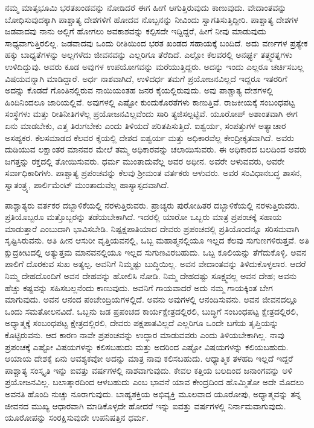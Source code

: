 ನಮ್ಮ ಮಾತೃಭೂಮಿ ಭರತಖಂಡವನ್ನು ನೋಡಿದರೆ ಈಗ ಹೀಗೆ ಆಗುತ್ತಿರುವುದು ಕಾಣುವುದು. ವೇದಾಂತವನ್ನು ಬೋಧಿಸುವುದಕ್ಕಾಗಿ ಪಾಶ್ಚಾತ್ಯ ದೇಶಗಳಿಗೆ ಹೋದವ\- ನೊಬ್ಬನನ್ನು ನೀವಿಂದು ಸ್ವಾಗತಿಸುತ್ತಿದ್ದೀರಿ. ಪಾಶ್ಚಾತ್ಯ ದೇಶಗಳ ಜಡವಾದವು ನಾನು ಅಲ್ಲಿಗೆ ಹೋಗಲು ಅವಕಾಶವನ್ನು ಕಲ್ಪಿಸದೇ ಇದ್ದಿದ್ದರೆ, ಹೀಗೆ ನೀವು ಮಾಡುವುದು ಸಾಧ್ಯವಾಗುತ್ತಿರಲಿಲ್ಲ. ಜಡವಾದವು ಒಂದು ರೀತಿಯಿಂದ ಭರತ ಖಂಡದ ಸಹಾಯಕ್ಕೆ ಬಂದಿದೆ. ಅದು ವರ್ಣಗಳ ಪ್ರತ್ಯೇಕ ಹಕ್ಕು ಬಾಧ್ಯತೆಗಳನ್ನು ಅಲ್ಲಗಳೆದು ಜೀವನವನ್ನು ಎಲ್ಲರಿಗೂ ತೆರೆದಿದೆ. ಎಲ್ಲೋ ಕೆಲವರಲ್ಲಿ ಅನರ್ಘ್ಯ ತತ್ತ್ವರತ್ನಗಳು ಉಳಿದಿದ್ದುವು. ಅವರು ಕೂಡ ಅವುಗಳ ಉಪಯೋಗವನ್ನು ಮರೆಯುತ್ತಿದ್ದರು. ಅದನ್ನು ಇಂದು ಎಲ್ಲರೂ ಚರ್ಚಿಸಬಲ್ಲ ವಿಷಯವನ್ನಾಗಿ ಮಾಡಿದ್ದಾರೆ. ಅರ್ಧ ನಾಶವಾಗಿದೆ, ಉಳಿದರ್ಧ ತಮಗೆ ಪ್ರಯೋಜನವಿಲ್ಲದೆ ಇದ್ದರೂ ಇತರರಿಗೆ ಅದನ್ನು ಕೊಡದೆ ಗೊಂತಿನಲ್ಲಿರುವ ನಾಯಿಯಂತಹ ಜನರ ಕೈಯಲ್ಲಿರುವುದು. ಅವು ಪಾಶ್ಚಾತ್ಯ ದೇಶಗಳಲ್ಲಿ ಹಿಂದಿನಿಂದಲೂ ಜಾರಿಯಲ್ಲಿವೆ. ಅವುಗಳಲ್ಲಿ ಎಷ್ಟೋ ಕುಂದುಕೊರತೆಗಳು ಕಾಣುತ್ತಿವೆ. ರಾಜಕೀಯಕ್ಕೆ ಸಂಬಂಧಪಟ್ಟ ಸಂಸ್ಥೆಗಳು ಮತ್ತು ರೀತಿನೀತಿಗಳೆಲ್ಲ ಪ್ರಯೋಜನವಿಲ್ಲವೆಂದು ಸಾರಿ ತ್ಯಜಿಸಲ್ಪಟ್ಟಿವೆ. ಯೂರೋಪ್​ ಅಶಾಂತವಾಗಿ ಈಗ ಏನು ಮಾಡಬೇಕು, ಎತ್ತ ತಿರುಗಬೇಕು ಎಂದು ತಿಳಿಯದೆ ಪರಿತಪಿಸುತ್ತಿದೆ. ಐಶ್ವರ್ಯ, ಸಂಪತ್ತುಗಳ ಅತ್ಯಾಚಾರ ಅಸಹ್ಯಕರ. ಕೆಲಸಮಾಡದ ಕೆಲವರ ಕೈಯಲ್ಲಿ ದೇಶದ ಐಶ್ವರ್ಯ ಮತ್ತು ಅಧಿಕಾರವೆಲ್ಲ ಕೇಂದ್ರೀಕೃತವಾಗಿದೆ. ಅವರು ದುಡಿಯುವ ಲಕ್ಷಾಂತರ ಮಾನವರ ಮೇಲೆ ತಮ್ಮ ಅಧಿಕಾರವನ್ನು ಚಲಾಯಿಸುವರು. ಈ ಅಧಿಕಾರದ ಬಲದಿಂದ ಅವರು ಜಗತ್ತನ್ನು ರಕ್ತದಲ್ಲಿ ತೋಯಿಸುವರು. ಧರ್ಮ ಮುಂತಾದುವೆಲ್ಲ ಅವರ ಅಧೀನ. ಅವರೇ ಆಳುವವರು, ಅವರೇ ಸರ್ವಾಧಿಕಾರಿಗಳು. ಪಾಶ್ಚಾತ್ಯ ಪ್ರಪಂಚವನ್ನು ಕೆಲವು ಶ‍್ರೀಮಂತ ವರ್ತಕರು ಆಳುವರು. ಅವರ ಸಂವಿಧಾನಬದ್ಧ ಶಾಸನ, ಸ್ವಾತಂತ್ರ್ಯ, ಪಾರ್ಲಿಮೆಂಟ್​ ಮುಂತಾದುವೆಲ್ಲ ಹಾಸ್ಯಾಸ್ಪದವಾಗಿದೆ.

ಪಾಶ್ಚಾತ್ಯರು ವರ್ತಕರ ದಬ್ಬಾಳಿಕೆಯಲ್ಲಿ ನರಳುತ್ತಿರುವರು. ಪ್ರಾಚ್ಯರು ಪುರೋಹಿತರ ದಬ್ಬಾಳಿಕೆಯಲ್ಲಿ ನರಳುತ್ತಿರುವರು. ಪ್ರತಿಯೊಬ್ಬರೂ ಮತ್ತೊಬ್ಬರನ್ನು ತಡೆಯಬೇಕಾಗಿದೆ. ಇದರಲ್ಲಿ ಯಾರೋ ಒಬ್ಬರು ಮಾತ್ರ ಪ್ರಪಂಚಕ್ಕೆ ಸಹಾಯ ಮಾಡುತ್ತಾರೆ ಎಂಬುದಾಗಿ ಭಾವಿಸಬೇಡಿ. ನಿಷ್ಪಕ್ಷಪಾತಿಯಾದ ದೇವರು ಪ್ರಪಂಚದಲ್ಲಿ ಪ್ರತಿಯೊಂದನ್ನೂ ಸರಿಸಮವಾಗಿ ಸೃಷ್ಟಿಸಿರುವನು. ಅತಿ ಹೀನ ಆಸುರೀ ವೃತ್ತಿಯವನಲ್ಲಿ, ಒಬ್ಬ ಮಹಾತ್ಮ\-ನಲ್ಲಿಯೂ ಇಲ್ಲದ ಕೆಲವು ಸುಗುಣಗಳಿರುತ್ತವೆ. ಅತಿ ಕ್ಷುದ್ರಕೀಟದಲ್ಲಿ ಅತ್ಯುತ್ತಮ ಮಾನವನಲ್ಲಿಯೂ ಇಲ್ಲದ ಸುಗುಣವಿರಬಹುದು. ಒಬ್ಬ ಕೂಲಿಯನ್ನು ತೆಗೆದುಕೊಳ್ಳಿ. ಅವನ ಪಾಲಿಗೆ ದೊರಕುವ ಸುಖ ಅತ್ಯಲ್ಪ. ಅವನಿಗೆ ನಿಮ್ಮಷ್ಟು ಬುದ್ಧಿಯಿಲ್ಲ. ಅವನ ವೇದಾಂತವನ್ನು ತಿಳಿದುಕೊಳ್ಳಲಾರ. ಆದರೆ ನಿಮ್ಮ ದೇಹದೊಂದಿಗೆ ಅವನ ದೇಹವನ್ನು ಹೋಲಿಸಿ ನೋಡಿ. ನಿಮ್ಮ ದೇಹದಷ್ಟು ಸೂಕ್ಷ್ಮವಲ್ಲ ಅವನ ದೇಹ; ಅವನು ಹೆಚ್ಚು ಕಷ್ಟವನ್ನು ಸಹಿಸಬಲ್ಲನೆಂದು ಕಾಣುವುದು. ಅವನಿಗೆ ಗಾಯವಾದರೆ ಅದು ನಮ್ಮ ಗಾಯಕ್ಕಿಂತ ಬೇಗ ಮಾಗುವುದು. ಅವನ ಆನಂದ ಪಂಚೇಂದ್ರಿಯಗಳಲ್ಲಿದೆ. ಅವನು ಅವುಗಳಲ್ಲಿ ಆನಂದಿಸುವನು. ಅವನ ಜೀವನದಲ್ಲೂ ಒಂದು ಸಮತೋಲನವಿದೆ. ಒಬ್ಬನು ಜಡ ಪ್ರಪಂಚದ ಕಾರ್ಯಕ್ಷೇತ್ರದಲ್ಲಿರಲಿ, ಬುದ್ಧಿಗೆ ಸಂಬಂಧಪಟ್ಟ ಕ್ಷೇತ್ರದಲ್ಲಿರಲಿ, ಅಧ್ಯಾತ್ಮಕ್ಕೆ ಸಂಬಂಧಪಟ್ಟ ಕ್ಷೇತ್ರದಲ್ಲಿರಲಿ, ದೇವರು ಪಕ್ಷಪಾತವಿಲ್ಲದೆ ಎಲ್ಲರಿಗೂ ಒಂದೇ ಬಗೆಯ ತೃಪ್ತಿಯನ್ನು ಕೊಟ್ಟಿರುವನು. ಆದ ಕಾರಣ ನಾವೇ ಪ್ರಪಂಚವನ್ನು ಉದ್ಧಾರ ಮಾಡುವವರು ಎಂದು ತಿಳಿಯಬೇಕಾಗಿಲ್ಲ. ನಾವು ಪ್ರಪಂಚಕ್ಕೆ ಎಷ್ಟೋ ವಿಷಯಗಳನ್ನು ಕಲಿಸಬಹುದು ಮತ್ತು ಅದರಿಂದ ಎಷ್ಟೋ ವಿಷಯಗಳನ್ನು ಕಲಿಯಬಹುದು. ಆಯಾಯ ದೇಶಕ್ಕೆ ಏನು ಆವಶ್ಯಕವೋ ಅದನ್ನು ಮಾತ್ರ ನಾವು ಕಲಿಸಬಹುದು. ಆಧ್ಯಾತ್ಮಿಕ ತಳಹದಿ ಇಲ್ಲದೆ ಇದ್ದರೆ ಪಾಶ್ಚಾತ್ಯ ಸಂಸ್ಕೃತಿ ಇನ್ನು ಐವತ್ತು ವರ್ಷಗಳಲ್ಲಿ ನಾಶವಾಗುವುದು. ಕೇವಲ ಕತ್ತಿಯ ಬಲದಿಂದ ಜನಾಂಗವನ್ನು ಆಳಿ ಪ್ರಯೋಜನವಿಲ್ಲ. ಬಲಾತ್ಕಾರದಿಂದ ಆಳಬಹುದು ಎಂಬ ಭಾವನೆ ಯಾವ ಕೇಂದ್ರದಿಂದ ಹೊಮ್ಮಿತೋ ಅದೇ ಮೊದಲು ಅವನತಿ ಹೊಂದಿ ನುಚ್ಚು ನೂರಾಗುವುದು. ಬಾಹ್ಯಶಕ್ತಿಯ ಅಭಿವ್ಯಕ್ತಿ ಮೂಲವಾದ ಯೂರೋಪು, ಅಧ್ಯಾತ್ಮವನ್ನು ತನ್ನ ಜೀವನದ ಮುಖ್ಯ ಆಧಾರವಾಗಿ ಮಾಡಿಕೊಳ್ಳದೇ ಹೋದರೆ ಇನ್ನು ಐವತ್ತು ವರ್ಷಗಳಲ್ಲಿ ನಿರ್ನಾಮವಾಗುವುದು. ಯೂರೋಪನ್ನು ಸಂರಕ್ಷಿಸುವುದೇ ಉಪನಿಷತ್ತಿನ ಧರ್ಮ.

